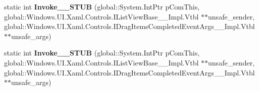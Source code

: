 \begin{DoxyCompactItemize}
\mbox{\label{struct_windows_1_1_foundation_1_1_typed_event_handler___a___windows___u_i___xaml___controls___li15051749ac89515b728f66d306810c20_a696b402ddea4349cabd3ea59ba1e236a}} 
static int {\bfseries Invoke\+\_\+\+\_\+\+S\+T\+UB} (global\+::\+System.\+Int\+Ptr p\+Com\+This, global\+::\+Windows.\+U\+I.\+Xaml.\+Controls.\+I\+List\+View\+Base\+\_\+\+\_\+\+Impl.\+Vtbl $\ast$$\ast$unsafe\+\_\+sender, global\+::\+Windows.\+U\+I.\+Xaml.\+Controls.\+I\+Drag\+Items\+Completed\+Event\+Args\+\_\+\+\_\+\+Impl.\+Vtbl $\ast$$\ast$unsafe\+\_\+args)
\item 
\mbox{\label{struct_windows_1_1_foundation_1_1_typed_event_handler___a___windows___u_i___xaml___controls___li15051749ac89515b728f66d306810c20_a696b402ddea4349cabd3ea59ba1e236a}} 
static int {\bfseries Invoke\+\_\+\+\_\+\+S\+T\+UB} (global\+::\+System.\+Int\+Ptr p\+Com\+This, global\+::\+Windows.\+U\+I.\+Xaml.\+Controls.\+I\+List\+View\+Base\+\_\+\+\_\+\+Impl.\+Vtbl $\ast$$\ast$unsafe\+\_\+sender, global\+::\+Windows.\+U\+I.\+Xaml.\+Controls.\+I\+Drag\+Items\+Completed\+Event\+Args\+\_\+\+\_\+\+Impl.\+Vtbl $\ast$$\ast$unsafe\+\_\+args)
\end{DoxyCompactItemize}
